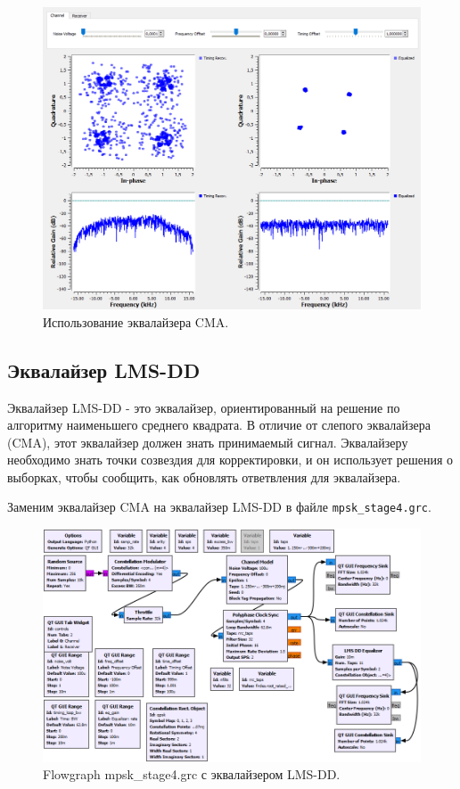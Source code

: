\documentclass[a4paper, 14pt]{extarticle}
\begin{document}
    \begin{figure}[H]
        \centering
        \includegraphics[width=0.9\linewidth]{resources/Images/task5_using_cma}
        \caption{Использование эквалайзера CMA.}
        \label{fig:task5_using_cma}
    \end{figure}

    \newpage
    \subsection{Эквалайзер LMS-DD}
    \label{subsec:task5_lms_dd}

    Эквалайзер LMS-DD - это эквалайзер, ориентированный на решение по алгоритму наименьшего среднего квадрата.
    В отличие от слепого эквалайзера (CMA), этот эквалайзер должен знать принимаемый сигнал.
    Эквалайзеру необходимо знать точки созвездия для корректировки, и он использует решения о выборках,
    чтобы сообщить, как обновлять ответвления для эквалайзера.

    Заменим эквалайзер CMA на эквалайзер LMS-DD в файле \texttt{mpsk\_stage4.grc}.

    \begin{figure}[H]
        \centering
        \includegraphics[width=0.7\linewidth]{resources/Images/task5_mpsk_stage4_lms_dd}
        \caption{Flowgraph mpsk\_stage4.grc с эквалайзером LMS-DD.}
        \label{fig:task5_mpsk_stage4_lms_dd}
    \end{figure}
\end{document}
